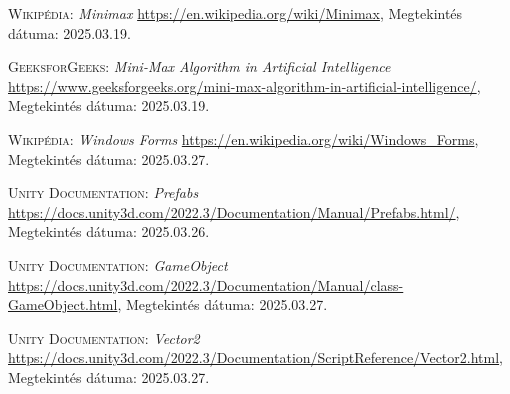 \documentclass[
]{thesis-ekf}
\theoremstyle{definition}
\theoremstyle{remark}
\begin{document}
\begin{thebibliography}{2}
\textsc{Wikipédia}: \emph{Minimax} 
\url{https://en.wikipedia.org/wiki/Minimax}, Megtekintés dátuma: 2025.03.19.

\textsc{GeeksforGeeks}: \emph{Mini-Max Algorithm in Artificial Intelligence} 
\url{https://www.geeksforgeeks.org/mini-max-algorithm-in-artificial-intelligence/}, Megtekintés dátuma: 2025.03.19.

\textsc{Wikipédia}: \emph{Windows Forms} 
\url{https://en.wikipedia.org/wiki/Windows_Forms}, Megtekintés dátuma: 2025.03.27.

\textsc{Unity Documentation}: \emph{Prefabs} 
\url{https://docs.unity3d.com/2022.3/Documentation/Manual/Prefabs.html/}, Megtekintés dátuma: 2025.03.26.

\textsc{Unity Documentation}: \emph{GameObject} 
\url{https://docs.unity3d.com/2022.3/Documentation/Manual/class-GameObject.html}, Megtekintés dátuma: 2025.03.27.

\textsc{Unity Documentation}: \emph{Vector2} 
\url{https://docs.unity3d.com/2022.3/Documentation/ScriptReference/Vector2.html}, Megtekintés dátuma: 2025.03.27.


\end{thebibliography}


\end{document}
